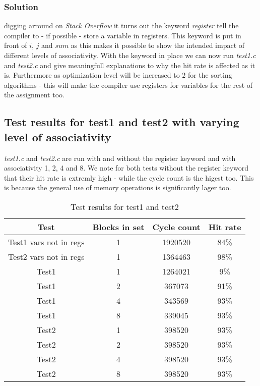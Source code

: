 \subsubsection{Solution} digging arround on \emph{Stack Overflow} it turns out
the keyword \emph{register} tell the compiler to - if possible - store a variable in
registers. This keyword is put in front of $i$, $j$ and $sum$ as this makes it
possible to show the intended impact of different levels of associativity. With
the keyword in place we can now run \emph{test1.c} and \emph{test2.c} and give
meaningfull explanations to why the hit rate is affected as it is. Furthermore
as optimization level will be increased to $2$ for the sorting algorithms - this
will make the compiler use registers for variables for the rest of the
assignment too.

\subsection{Test results for test1 and test2 with varying level of
associativity}
\emph{test1.c} and \emph{test2.c} are run with and without the register keyword
and with associativity 1, 2, 4 and 8. We note for both tests without the
register keyword that their hit rate is extremly high - while the cycle count is
the higest too. This is because the general use of memory operations is
significantly lager too.

\begin{table}[H]
  \centering
  \begin{tabular}{c | c | c | c |}
    Test	&	Blocks in set	&	Cycle count	&	Hit rate	\\ \hline
    Test1 vars not in regs
    		&	1				&	1920520		&	84\%		\\ \hline
    Test2 vars not in regs
    		&	1				&	1364463		&	98\%		\\ \hline \hline
    Test1	&	1				&	1264021		&	9\%			\\ \hline
    Test1	&	2				&	367073		&	91\%		\\ \hline
    Test1	&	4				&	343569		&	93\%		\\ \hline
    Test1	&	8				&	339045		&	93\%		\\ \hline \hline
    Test2	&	1				&	398520		&	93\%		\\ \hline
    Test2	&	2				&	398520		&	93\%		\\ \hline
    Test2	&	4				&	398520		&	93\%		\\ \hline
    Test2	&	8				&	398520		&	93\%		\\ \hline 
  \end{tabular}
  \caption{Test results for test1 and test2}
  \label{tab:test}
\end{table}

